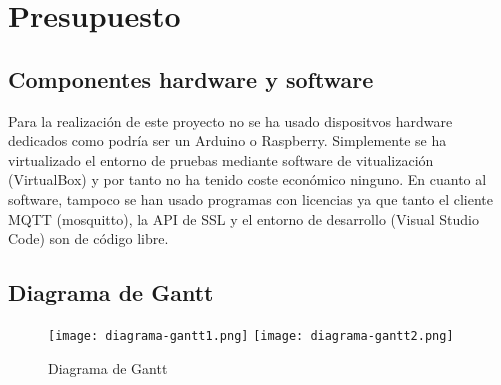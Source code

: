 \chapter{Presupuesto}
\label{chap:presupuesto}

\section{Componentes hardware y software}

Para la realización de este proyecto no se ha usado dispositvos hardware dedicados como podría ser un Arduino o Raspberry.
Simplemente se ha virtualizado el entorno de pruebas mediante software de vitualización (VirtualBox) y por tanto no ha tenido
coste económico ninguno. En cuanto al software, tampoco se han usado programas con licencias ya que tanto el cliente MQTT 
(mosquitto), la API de SSL y el entorno de desarrollo (Visual Studio Code) son de código libre.

\section{Diagrama de Gantt}

\begin{figure}[H]
    \centering
    \texttt{[image: diagrama-gantt1.png]}
    \texttt{[image: diagrama-gantt2.png]}
    \caption{Diagrama de Gantt}
\end{figure}
